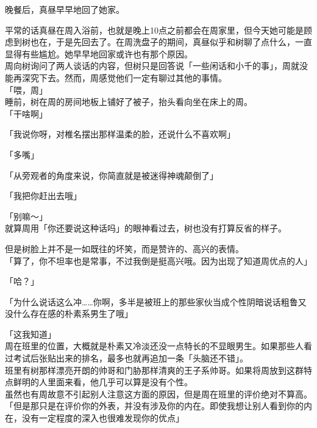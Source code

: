 晚餐后，真昼早早地回了她家。

平常的话真昼在周入浴前，也就是晚上10点之前都会在周家里，但今天她可能是顾虑到树也在，于是先回去了。在周洗盘子的期间，真昼似乎和树聊了点什么，一直显得有些尴尬。她早早地回家或许也有那个原因。\\

周向树询问了两人谈话的内容，但树只是回答说「一些闲话和小千的事」，周就没能再深究下去。然而，周感觉他们一定有聊过其他的事情。\\

「喂，周」\\

睡前，树在周的房间地板上铺好了被子，抬头看向坐在床上的周。\\

「干啥啊」

「我说你呀，对椎名摆出那样温柔的脸，还说什么不喜欢啊」

「多嘴」

「从旁观者的角度来说，你简直就是被迷得神魂颠倒了」

「我把你赶出去哦」

「别嘛～」\\

就算周用「你还要说这种话吗」的眼神看过去，树也没有打算反省的样子。

但是树脸上并不是一如既往的坏笑，而是赞许的、高兴的表情。\\

「算了，你不坦率也是常事，不过我倒是挺高兴哦。因为出现了知道周优点的人」

「哈？」

「为什么说话这么冲……你啊，多半是被班上的那些家伙当成个性阴暗说话粗鲁又没什么存在感的朴素系男生了哦」

「这我知道」\\

周在班里的位置，大概就是朴素又冷淡还没一点特长的不显眼男生。如果那些人看过考试后张贴出来的排名，最多也就再追加一条「头脑还不错」。\\

班里有树那样漂亮开朗的帅哥和门胁那样清爽的王子系帅哥。如果将周放到这群特点鲜明的人里面来看，他几乎可以算是没有个性。\\

虽然也有周故意不引起别人注意这方面的原因，但是周在班里的评价绝对不算高。\\

「但是那只是在评价你的外表，并没有涉及你的内在。即使我想让别人看到你的内在，没有一定程度的深入也很难发现你的优点」\\

